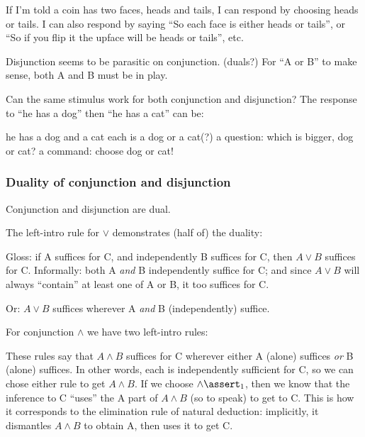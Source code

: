 \documentclass{article}
\begin{document}
If I'm told a coin has two faces, heads and tails, I can respond by
choosing heads or tails. I can also respond by saying ``So each face
is either heads or tails'', or ``So if you flip it the upface will be
heads or tails'', etc.

Disjunction seems to be parasitic on conjunction. (duals?) For ``A or
B'' to make sense, both A and B must be in play.

Can the same stimulus work for both conjunction and disjunction? The
response to ``he has a dog'' then ``he has a cat'' can be:

he has a dog and a cat
each is a dog or a cat(?)
a question: which is bigger, dog or cat?
a command: choose dog or cat!

\subsubsection{Duality of conjunction and disjunction}
Conjunction and disjunction are dual.

The left-intro rule for \(\lor\) demonstrates (half of) the duality:


Gloss: if A suffices for C, and independently B suffices for C,
then \(A\lor B\) suffices for C. Informally: both A \textit{and} B
independently suffice for C; and since \(A\lor B\) will always
``contain'' at least one of A or B, it too suffices for C.

Or: \(A\lor B\) suffices wherever A \textit{and} B (independently)
suffice.

For conjunction \(\land\) we have two left-intro rules:


These rules say that \(A\land B\) suffices for C wherever either A
(alone) suffices \textit{or} B (alone) suffices. In other words, each
is independently sufficient for C, so we can chose either rule to get
\(A\land B\). If we choose \(\land\linfer_1\), then we know that the
inference to C ``uses'' the A part of \(A\land B\) (so to speak) to
get to C. This is how it corresponds to the elimination rule of
natural deduction: implicitly, it dismantles \(A\land B\) to obtain A,
then uses it to get C.
\end{document}
